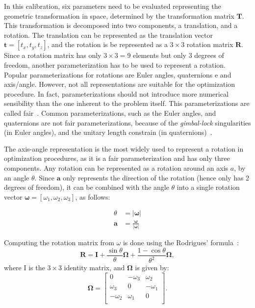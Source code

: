 \documentclass[conference]{IEEEtran}
\begin{document}
In this calibration, six parameters need to be evaluated representing the geometric transformation in space, determined by the transformation matrix $\bm{T}$. This transformation is decomposed into two components, a translation, and a rotation. The translation can be represented as the translation vector $\mathbf{t} = \left[t_x, t_y, t_z\right]$, and the rotation is be represented as a $3 \times 3$ rotation matrix $\bm{R}$. Since a rotation matrix has only $3 \times 3 = 9$ elements but only 3 degrees of freedom, another parameterization has to be used to represent a rotation. Popular parameterizations for rotations are Euler angles, quaternions e and axis/angle. However, not all representations are suitable for the optimization procedure. In fact, parameterizations should not introduce more numerical sensibility than the one inherent to the problem itself. This parameterizations are called fair~\cite{hornegger99}. Common parameterizations, such as the Euler angles, and quaternions are not fair parameterizations, because of the \textit{gimbal-lock} singularities (in Euler angles), and the unitary length constrain (in quaternions)~\cite{schmidt01}.

The axis-angle representation is the most widely used to represent a rotation in optimization procedures, as it is a fair parameterization and has only three components. Any rotation can be represented as a rotation around an axis $a$, by an angle $\theta$. Since $\bm{a}$ only represents the direction of the rotation (hence only has 2 degrees of freedom), it can be combined with the angle $\theta$ into a single rotation vector $\bm{\omega} = \left[\omega_1, \omega_2, \omega_3\right]$, as follows:

\begin{equation}
    \label{eqn:axis-angle}
    \begin{aligned}
        \theta & = |\bm{\omega}| \\
        \bm{a} & = \frac{\bm{\omega}}{|\bm{\omega}|}
    \end{aligned}
\end{equation}

Computing the rotation matrix from $\omega$ is done using the Rodrigues' formula~\cite{schmidt01}:
%
\begin{equation}
    \textbf{R} = \bm{I} + \frac{\sin \theta}{\theta} \bm{\Omega} + \frac{1 - \cos \theta}{\theta^2} \bm{\Omega},
\end{equation}
%
\noindent
where I is the $3\times3$ identity matrix, and $\bm{\Omega}$ is given by:
%
\begin{equation}
    \bm{\Omega} = \left[
        \begin{array}{ccc}
            0  & -\omega_3 & \omega_2 \\
            \omega_3 & 0   & -\omega_1 \\
            -\omega_2 & \omega_1 & 0 \\
        \end{array}
    \right].
\end{equation}
\end{document}
